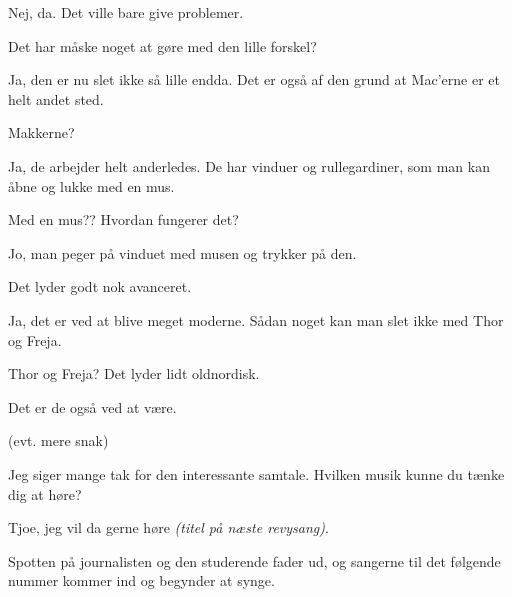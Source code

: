 \documentclass[a4paper,11pt]{article}
\begin{document}
\begin{sketch}
   Nej, da.  Det ville bare give problemer.

   Det har måske noget at gøre med den lille
  forskel?

   Ja, den er nu slet ikke så lille endda.  Det er
  også af den grund at Mac'erne er et helt andet sted.

   Makkerne?

   Ja, de arbejder helt anderledes.  De har vinduer og
  rullegardiner, som man kan åbne og lukke med en mus.

   Med en mus??  Hvordan fungerer det?

   Jo, man peger på vinduet med musen og trykker på
  den.

   Det lyder godt nok avanceret.

   Ja, det er ved at blive meget moderne.  Sådan noget
  kan man slet ikke med Thor og Freja.

   Thor og Freja?  Det lyder lidt oldnordisk.

   Det er de også ved at være.

  \scene (evt. mere snak)

   Jeg siger mange tak for den interessante
  samtale.  Hvilken musik kunne du tænke dig at høre?

   Tjoe, jeg vil da gerne høre \emph{(titel på næste
    revysang)}.

  \scene Spotten på journalisten og den studerende fader ud, og
  sangerne til det følgende nummer kommer ind og begynder at synge.
\end{sketch}
\end{document}
